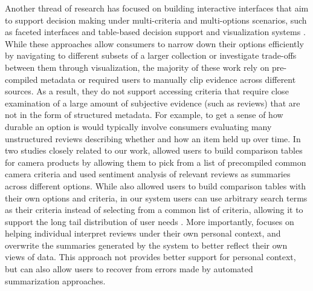 Another thread of research has focused on building interactive interfaces that aim to support decision making under multi-criteria and multi-options scenarios, such as faceted interfaces \cite{hearst2006design,schraefel2006mspace} and table-based decision support and visualization systems \cite{chi1997spreadsheet,rao1994table,spenke1996focus,liu2019unakite}. While these approaches allow consumers to narrow down their options efficiently by navigating to different subsets of a larger collection or investigate trade-offs between them through visualization, the majority of these work rely on pre-compiled metadata or required users to manually clip evidence across different sources. As a result, they do not support accessing criteria that require close examination of a large amount of subjective evidence (such as reviews) that are not in the form of structured metadata. For example, to get a sense of how durable an option is would typically involve consumers evaluating many unstructured reviews describing whether and how an item held up over time. In two studies closely related to our work, \cite{chen2014experiment,chen2017explaining} allowed users to build comparison tables for camera products by allowing them to pick from a list of precompiled common camera criteria and used sentiment analysis of relevant reviews as summaries across different options. While \SYSTEM also allowed users to build comparison tables with their own options and criteria, in our system users can use arbitrary search terms as their criteria instead of selecting from a common list of criteria, allowing it to support the long tail distribution of user needs \cite{bernstein2012direct}. More importantly, \SYSTEM focuses on helping individual interpret reviews under their own personal context, and overwrite the summaries generated by the system to better reflect their own views of data. This approach not provides better support for personal context, but can also allow users to recover from errors made by automated summarization approaches.


